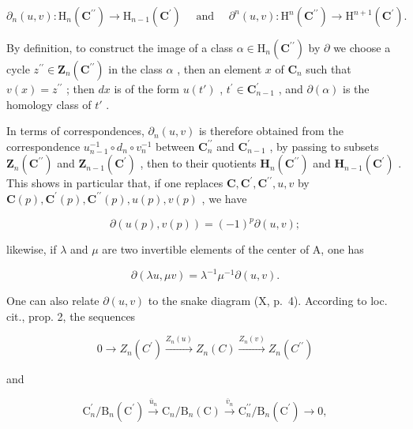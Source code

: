 \[
\partial_ {n} (u, v): \mathrm{H} _ {n} (\mathbf {C} ^ {\prime \prime}) \rightarrow \mathrm{H} _ {n - 1} (\mathbf {C} ^ {\prime}) \quad \text { and } \quad \partial^ {n} (u, v): \mathrm{H} ^ {n} (\mathbf {C} ^ {\prime \prime}) \rightarrow \mathrm{H} ^ {n + 1} (\mathbf {C} ^ {\prime}).
\]

By definition, to construct the image of a class \(\alpha\in\mathrm{H}_{n}(\mathbf{C}^{\prime\prime})\) by \(\partial\) we choose a cycle \(z^{\prime\prime}\in\mathbf{Z}_{n}(\mathbf{C}^{\prime\prime})\) in the class \(\alpha\) , then an element \(x\) of \(\mathbf{C}_{n}\) such that \(v(x)=z^{\prime\prime}\) ; then \(dx\) is of the form \(u(t')\) , \(t^{\prime}\in\mathbf{C}_{n-1}^{\prime}\) , and \(\partial(\alpha)\) is the homology class of \(t'\) .

In terms of correspondences, \(\partial_{n}(u,v)\) is therefore obtained from the correspondence \(u_{n-1}^{-1}\circ d_{n}\circ v_{n}^{-1}\) between \(\mathbf{C}_{n}^{\prime\prime}\) and \(\mathbf{C}_{n-1}^{\prime}\) , by passing to subsets \(\mathbf{Z}_{n}(\mathbf{C}^{\prime\prime})\) and \(\mathbf{Z}_{n-1}(\mathbf{C}^{\prime})\) , then to their quotients \(\mathbf{H}_{n}(\mathbf{C}^{\prime\prime})\) and \(\mathbf{H}_{n-1}(\mathbf{C}^{\prime})\) . This shows in particular that, if one replaces \(\mathbf{C},\mathbf{C}^{\prime},\mathbf{C}^{\prime\prime},u,v\) by \(\mathbf{C}(p),\mathbf{C}^{\prime}(p),\mathbf{C}^{\prime\prime}(p),u(p),v(p)\) , we have

\[
\partial (u (p), v (p)) = (- 1) ^ {p} \partial (u, v);\tag{4}
\]

likewise, if \(\lambda\) and \(\mu\) are two invertible elements of the center of A, one has

\[
\partial (\lambda u, \mu v) = \lambda^ {- 1} \mu^ {- 1} \partial (u, v).\tag{5}
\]

One can also relate \(\partial(u,v)\) to the snake diagram (X, p.~4). According to loc. cit., prop. 2, the sequences

\[
0 \longrightarrow Z _ {n} (C ^ {\prime}) \xrightarrow {Z _ {n} (u)} Z _ {n} (C) \xrightarrow {Z _ {n} (v)} Z _ {n} (C ^ {\prime \prime})
\]

and

\[
\mathrm{C} _ {n} ^ {\prime} / \mathrm{B} _ {n} (\mathrm{C} ^ {\prime}) \xrightarrow {\overline {{{u}}} _ {n}} \mathrm{C} _ {n} / \mathrm{B} _ {n} (\mathrm{C}) \xrightarrow {\overline {{{v}}} _ {n}} \mathrm{C} _ {n} ^ {\prime \prime} / \mathrm{B} _ {n} (\mathrm{C} ^ {\prime}) \longrightarrow 0,
\]

